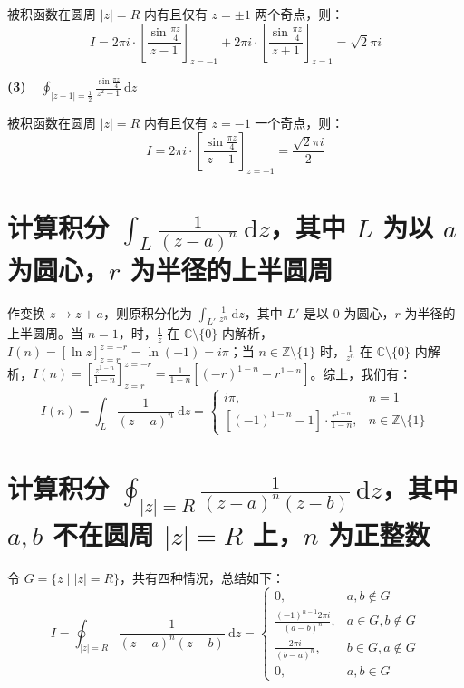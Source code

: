 \documentclass[UTF8]{report}
\def\Z{\mathbb{Z}}
\def\C{\mathbb{C}}
\theoremstyle{MyLineTheoremStyle} %
\theoremstyle{MyBlockTheoremStyle} %
\theoremstyle{MySubsubsectionStyle} %
\begin{document}
被积函数在圆周 $| z | = R$ 内有且仅有 $z = \pm 1$ 两个奇点，则：
\begin{equation*}
I 
= 2 \pi i \cdot \left[ \frac{\sin \frac{\pi z}{4}}{z - 1}  \right]_{z = -1} +  2 \pi i \cdot \left[ \frac{\sin \frac{\pi z}{4}}{z + 1}  \right]_{z = 1} = \sqrt{2} \pi i 
\end{equation*}

\textbf{(3)\ \ }$\displaystyle \oint_{| z + 1 | = \frac{1}{2} } \frac{\sin \frac{\pi z}{4}}{z^2 - 1}  \ \mathrm{d} z$

被积函数在圆周 $| z | = R$ 内有且仅有 $z = -1$ 一个奇点，则：
\begin{equation*}
I 
= 2 \pi i \cdot \left[ \frac{\sin \frac{\pi z}{4}}{z - 1}  \right]_{z = -1}
= \frac{\sqrt{2} \pi i }{2}
\end{equation*}



\section{计算积分 $\displaystyle \int_{L} \frac{1}{(z - a)^n} \ \mathrm{d}z $，其中 $L$ 为以 $a$ 为圆心，$r$ 为半径的上半圆周}

作变换 $z \to z + a$，则原积分化为 $\int_{L'} \frac{1}{z^n} \ \mathrm{d}z$，其中 $L'$ 是以 0 为圆心，$r$ 为半径的上半圆周。当 $n = 1$，时，$\frac{1}{z}$ 在 $\C \setminus \{ 0 \} $ 内解析，$I(n) = \left[ \ln z \right]_{z = r}^{z = -r} = \ln(-1) = i \pi$；当 $n \in \Z \setminus \{ 1 \}$ 时，$\frac{1}{z^n}$ 在 $\C \setminus \{ 0 \} $ 内解析，$I(n) = \left[ \frac{z^{1-n}}{1-n} \right]_{z = r}^{z = -r}  =  \frac{1}{1 - n}\left[  (-r)^{1-n} - r^{1-n} \right]$。综上，我们有：
\begin{equation*}
I(n) = \int_{L} \frac{1}{(z - a)^n} \ \mathrm{d}z
= 
\begin{cases}
    i\pi, & n = 1 \\
    \left[ (-1)^{1-n} -1 \right]\cdot\frac{r^{1-n}}{1-n}, & n \in \Z \setminus \{ 1 \}
\end{cases}
\end{equation*}

\section{计算积分 $\displaystyle \oint_{| z | = R} \frac{1}{(z-a)^n(z-b)}  \ \mathrm{d}z $，其中 $a, b$ 不在圆周 $| z | = R$ 上，$n$ 为正整数}

令 $G = \{ z \mid | z | = R\}$，共有四种情况，总结如下：
\begin{equation*}
I = \oint_{| z | = R} \frac{1}{(z-a)^n(z-b)}  \ \mathrm{d}z
= 
\begin{cases}
    0, & a, b \notin G \\ 
    \frac{(-1)^{n-1}2 \pi i }{(a-b)^n}, & a \in G, b \notin G \\ 
    \frac{2 \pi i}{(b-a)^n}, & b \in G, a \notin G \\ 
    0, & a, b \in G
\end{cases}
\end{equation*}
\end{document}

